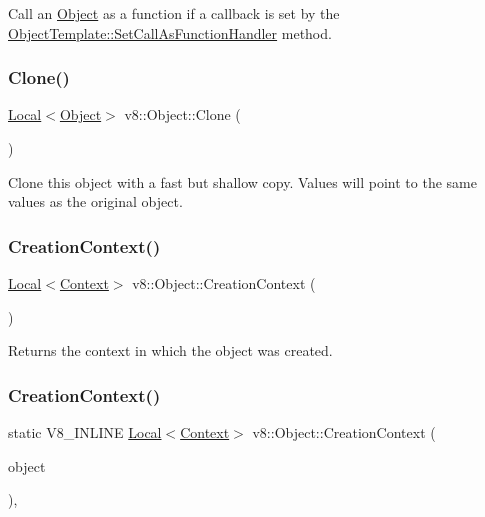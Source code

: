 Call an \mbox{\hyperlink{classv8_1_1Object}{Object}} as a function if a callback is set by the \mbox{\hyperlink{classv8_1_1ObjectTemplate_a1775c8f73e643c339804d2f5b628eddf}{Object\+Template\+::\+Set\+Call\+As\+Function\+Handler}} method. \mbox{\label{classv8_1_1Object_a5018c9d085aa71f65530cf1e073a04ad}} 
\subsubsection{\texorpdfstring{Clone()}{Clone()}}
{\footnotesize\ttfamily \mbox{\hyperlink{classv8_1_1Local}{Local}}$<$\mbox{\hyperlink{classv8_1_1Object}{Object}}$>$ v8\+::\+Object\+::\+Clone (\begin{DoxyParamCaption}{ }\end{DoxyParamCaption})}

Clone this object with a fast but shallow copy. Values will point to the same values as the original object. \mbox{\label{classv8_1_1Object_af6966283a7d7e20779961eed434db04d}} 
\subsubsection{\texorpdfstring{Creation\+Context()}{CreationContext()}\hspace{0.1cm}{\footnotesize\ttfamily [1/2]}}
{\footnotesize\ttfamily \mbox{\hyperlink{classv8_1_1Local}{Local}}$<$\mbox{\hyperlink{classv8_1_1Context}{Context}}$>$ v8\+::\+Object\+::\+Creation\+Context (\begin{DoxyParamCaption}{ }\end{DoxyParamCaption})}

Returns the context in which the object was created. \mbox{\label{classv8_1_1Object_ae958203f358c7af3727ef7179790d01f}} 
\subsubsection{\texorpdfstring{Creation\+Context()}{CreationContext()}\hspace{0.1cm}{\footnotesize\ttfamily [2/2]}}
{\footnotesize\ttfamily static V8\+\_\+\+I\+N\+L\+I\+NE \mbox{\hyperlink{classv8_1_1Local}{Local}}$<$\mbox{\hyperlink{classv8_1_1Context}{Context}}$>$ v8\+::\+Object\+::\+Creation\+Context (\begin{DoxyParamCaption}\item[{const \mbox{\hyperlink{classv8_1_1PersistentBase}{Persistent\+Base}}$<$ \mbox{\hyperlink{classv8_1_1Object}{Object}} $>$ \&}]{object }\end{DoxyParamCaption})\hspace{0.3cm}{\ttfamily [inline]}, {\ttfamily [static]}}


